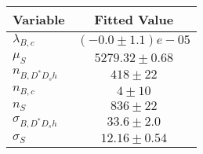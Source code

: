 \begin{tabular}[t]{lc}
\hline
Variable &Fitted Value\\
\hline\hline
$\lambda_{B,c}$&$(-0.0\pm1.1)e-05$\\
\hline
$\mu_S$&$5279.32\pm0.68$\\
\hline
$n_{B, D^* D_s h}$&$418\pm22$\\
\hline
$n_{B,c}$&$4\pm10$\\
\hline
$n_S$&$836\pm22$\\
\hline
$\sigma_{B, D^* D_s h}$&$33.6\pm2.0$\\
\hline
$\sigma_S$&$12.16\pm0.54$\\
\hline
\end{tabular}